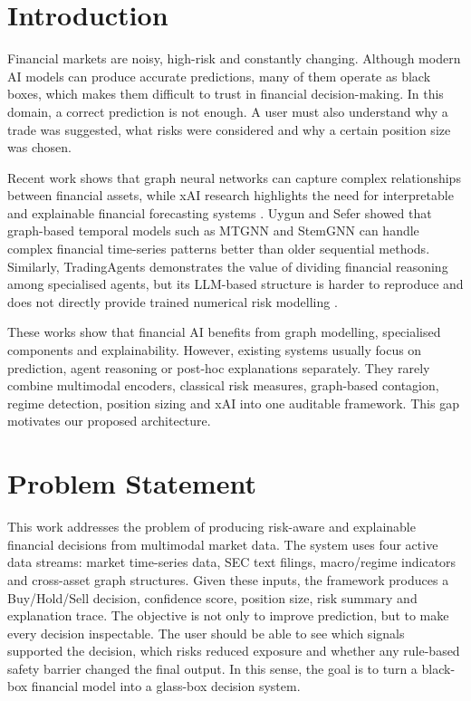 \documentclass[conference]{IEEEtran}
\begin{document}
\section{Introduction}

Financial markets are noisy, high-risk and constantly changing. Although modern AI models can produce accurate predictions, many of them operate as black boxes, which makes them difficult to trust in financial decision-making. In this domain, a correct prediction is not enough. A user must also understand why a trade was suggested, what risks were considered and why a certain position size was chosen.

Recent work shows that graph neural networks can capture complex relationships between financial assets, while xAI research highlights the need for interpretable and explainable financial forecasting systems \cite{financesurvey,12thPaper}. Uygun and Sefer \cite{13thPaper} showed that graph-based temporal models such as MTGNN and StemGNN can handle complex financial time-series patterns better than older sequential methods. Similarly, TradingAgents demonstrates the value of dividing financial reasoning among specialised agents, but its LLM-based structure is harder to reproduce and does not directly provide trained numerical risk modelling \cite{1stPaper}.

These works show that financial AI benefits from graph modelling, specialised components and explainability. However, existing systems usually focus on prediction, agent reasoning or post-hoc explanations separately. They rarely combine multimodal encoders, classical risk measures, graph-based contagion, regime detection, position sizing and xAI into one auditable framework. This gap motivates our proposed architecture.

\section{Problem Statement}

This work addresses the problem of producing risk-aware and explainable financial decisions from multimodal market data. The system uses four active data streams: market time-series data, SEC text filings, macro/regime indicators and cross-asset graph structures. Given these inputs, the framework produces a Buy/Hold/Sell decision, confidence score, position size, risk summary and explanation trace. The objective is not only to improve prediction, but to make every decision inspectable. The user should be able to see which signals supported the decision, which risks reduced exposure and whether any rule-based safety barrier changed the final output. In this sense, the goal is to turn a black-box financial model into a glass-box decision system.
\end{document}
